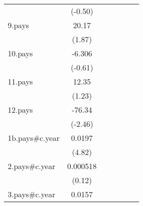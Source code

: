 {\begin{tabular}{l*{6}{c}}
                    &     (-0.50)         &                     &                     &                     &                     &                     \\
[1em]
9.pays              &       20.17         &                     &                     &                     &                     &                     \\
                    &      (1.87)         &                     &                     &                     &                     &                     \\
[1em]
10.pays             &      -6.306         &                     &                     &                     &                     &                     \\
                    &     (-0.61)         &                     &                     &                     &                     &                     \\
[1em]
11.pays             &       12.35         &                     &                     &                     &                     &                     \\
                    &      (1.23)         &                     &                     &                     &                     &                     \\
[1em]
12.pays             &      -76.34\sym{*}  &                     &                     &                     &                     &                     \\
                    &     (-2.46)         &                     &                     &                     &                     &                     \\
[1em]
1b.pays#c.year      &      0.0197\sym{***}&                     &                     &                     &                     &                     \\
                    &      (4.82)         &                     &                     &                     &                     &                     \\
[1em]
2.pays#c.year       &    0.000518         &                     &                     &                     &                     &                     \\
                    &      (0.12)         &                     &                     &                     &                     &                     \\
[1em]
3.pays#c.year       &      0.0157\sym{***}&                     &                     &                     &                     &                     \\

\end{tabular}}
